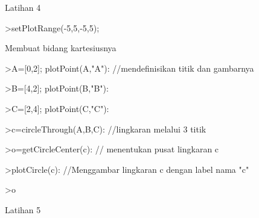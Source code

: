 \documentclass[a4paper,10pt]{article}
\begin{document}
\begin{eulernotebook}
\begin{eulercomment}
\begin{eulercomment}
\begin{eulercomment}
Latihan 4\\
\end{eulercomment}
\eulersubheading{}
\begin{eulerprompt}
>setPlotRange(-5,5,-5,5); 
\end{eulerprompt}
\begin{eulercomment}
Membuat bidang kartesiusnya
\end{eulercomment}
\begin{eulerprompt}
>A=[0,2]; plotPoint(A,"A"): //mendefinisikan titik dan gambarnya
\end{eulerprompt}
\begin{eulerprompt}
>B=[4,2]; plotPoint(B,"B"): 
\end{eulerprompt}
\begin{eulerprompt}
>C=[2,4]; plotPoint(C,"C"):
\end{eulerprompt}
\begin{eulerprompt}
>c=circleThrough(A,B,C): //lingkaran melalui 3 titik
\end{eulerprompt}
\begin{eulerprompt}
>o=getCircleCenter(c): // menentukan pusat lingkaran c
\end{eulerprompt}
\begin{eulerprompt}
>plotCircle(c): //Menggambar lingkaran c dengan label nama "c"
\end{eulerprompt}
\begin{eulerprompt}
>o
\end{eulerprompt}
\begin{euleroutput}
  [2,  2]
\end{euleroutput}
\begin{eulercomment}
Latihan 5\\
\end{eulercomment}

\end{eulercomment}
\end{eulercomment}
\end{eulernotebook}
\end{document}
